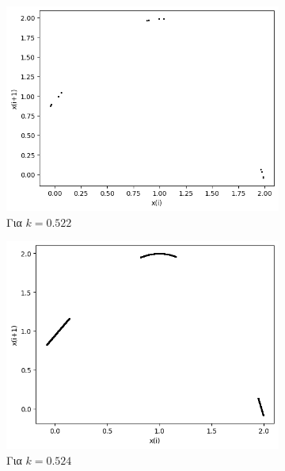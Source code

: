 \begin{figure}[ht]
	\centering
	\begin{subfigure}[c]{0.4\textwidth}
		\centering
		\includegraphics[width=\textwidth]{LateX images/graphs/k0522}
		\caption{Για $k=0.522$}
		\label{f:k8}
	\end{subfigure}
	\hfill
	\begin{subfigure}[c]{0.4\textwidth}
		\centering
		\includegraphics[width=\textwidth]{LateX images/graphs/k0524}
		\caption{Για $k=0.524$}
		\label{f:k9}
	\end{subfigure}
	\hfill
	\begin{subfigure}[c]{0.4\textwidth}
		\centering

\end{subfigure}
\end{figure}
